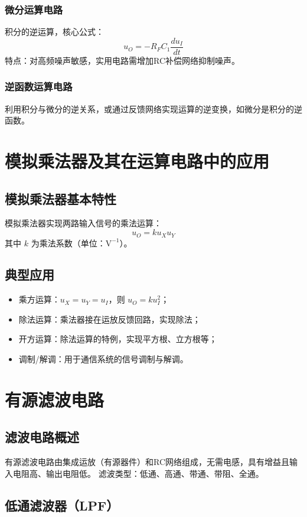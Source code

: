 \subsubsection{微分运算电路}
积分的逆运算，核心公式：
\[ u_O = -R_F C_1 \frac{du_I}{dt} \]
特点：对高频噪声敏感，实用电路需增加RC补偿网络抑制噪声。

\subsubsection{逆函数运算电路}
利用积分与微分的逆关系，或通过反馈网络实现运算的逆变换，如微分是积分的逆函数。

\section{模拟乘法器及其在运算电路中的应用}
\subsection{模拟乘法器基本特性}
模拟乘法器实现两路输入信号的乘法运算：
\[ u_O = k u_{X} u_{Y} \]
其中 $k$ 为乘法系数（单位：$\text{V}^{-1}$）。

\subsection{典型应用}
\begin{itemize}
    \item 乘方运算：$u_X = u_Y = u_I$，则 $u_O = k u_I^2$；
    \item 除法运算：乘法器接在运放反馈回路，实现除法；
    \item 开方运算：除法运算的特例，实现平方根、立方根等；
    \item 调制/解调：用于通信系统的信号调制与解调。
\end{itemize}

\section{有源滤波电路}
\subsection{滤波电路概述}
有源滤波电路由集成运放（有源器件）和RC网络组成，无需电感，具有增益且输入电阻高、输出电阻低。
滤波类型：低通、高通、带通、带阻、全通。

\subsection{低通滤波器（LPF）}
